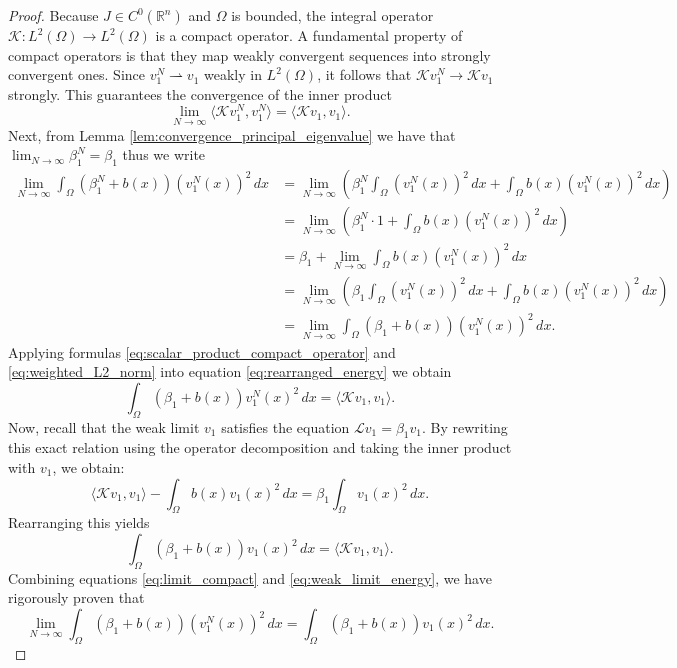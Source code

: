 \documentclass[10pt,a4paper]{amsart}
\begin{document}
\begin{proof}
    Because $J \in C^0(\mathbb{R}^n)$ and $\Omega$ is bounded, the integral operator $\mathcal{K} : L^2(\Omega) \to L^2(\Omega)$ is a compact operator. A fundamental property of compact operators is that they map weakly convergent sequences into strongly convergent ones. Since $v_1^N \rightharpoonup v_1$ weakly in $L^2(\Omega)$, it follows that $\mathcal{K} v_1^N \to \mathcal{K} v_1$ strongly. This guarantees the convergence of the inner product
    \begin{equation}
        \label{eq:scalar_product_compact_operator}
        \lim_{N \to \infty} \langle \mathcal{K} v_1^N, v_1^N \rangle = \langle \mathcal{K} v_1, v_1 \rangle.
    \end{equation}
    Next, from Lemma \ref{lem:convergence_principal_eigenvalue} we have that $\lim_{N \to \infty} \beta_1^N = \beta_1$ thus we write
    \begin{align}
        \lim_{N \to \infty} \int_\Omega (\beta_1^N + b(x)) (v_1^N(x))^2 \, dx 
        &= \lim_{N \to \infty} \left( \beta_1^N \int_\Omega (v_1^N(x))^2 \, dx + \int_\Omega b(x) (v_1^N(x))^2 \, dx \right) \nonumber \\
        &= \lim_{N \to \infty} \left( \beta_1^N \cdot 1 + \int_\Omega b(x) (v_1^N(x))^2 \, dx \right) \nonumber \\
        &= \beta_1 + \lim_{N \to \infty} \int_\Omega b(x) (v_1^N(x))^2 \, dx \nonumber \\
        &= \lim_{N \to \infty} \left( \beta_1 \int_\Omega (v_1^N(x))^2 \, dx + \int_\Omega b(x) (v_1^N(x))^2 \, dx \right) \nonumber \\
        &= \lim_{N \to \infty} \int_\Omega (\beta_1 + b(x)) (v_1^N(x))^2 \, dx.
        \label{eq:weighted_L2_norm}
    \end{align}
    Applying formulas \eqref{eq:scalar_product_compact_operator} and \eqref{eq:weighted_L2_norm} into equation \eqref{eq:rearranged_energy} we obtain
    \begin{equation} 
        \label{eq:limit_compact}
        \int_\Omega (\beta_1 + b(x)) v_1^N(x)^2 \, dx = \langle \mathcal{K} v_1, v_1 \rangle.
    \end{equation}
    Now, recall that the weak limit $v_1$ satisfies the equation $\mathcal{L} v_1 = \beta_1 v_1$. By rewriting this exact relation using the operator decomposition and taking the inner product with $v_1$, we obtain:
    \begin{equation}
        \langle \mathcal{K} v_1, v_1 \rangle - \int_\Omega b(x) v_1(x)^2 \, dx = \beta_1 \int_\Omega v_1(x)^2 \, dx.
    \end{equation}
    Rearranging this yields
    \begin{equation} \label{eq:weak_limit_energy}
        \int_\Omega (\beta_1 + b(x)) v_1(x)^2 \, dx = \langle \mathcal{K} v_1, v_1 \rangle.
    \end{equation}
    Combining equations \eqref{eq:limit_compact} and \eqref{eq:weak_limit_energy}, we have rigorously proven that
    \begin{equation} \label{eq:norm_convergence}
        \lim_{N \to \infty} \int_\Omega (\beta_1 + b(x)) (v_1^N(x))^2 \, dx = \int_\Omega (\beta_1 + b(x)) v_1(x)^2 \, dx.
    \end{equation}
    

\end{proof}
\end{document}
